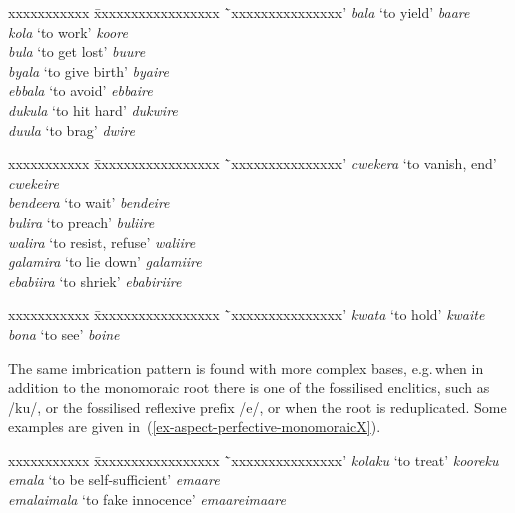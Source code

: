 \ea \label{ex-aspect-perfective-lateral}
\begin{tabbing}
xxxxxxxxxxx \= xxxxxxxxxxxxxxxxx \=`xxxxxxxxxxxxxxx'\kill
\textit{bala} \>`to yield'\> \textit{baare}\\
\textit{kola} \>`to work'\>  \textit{koore}\\
\textit{bula} \>`to get lost'\> \textit{buure}\\
\textit{byala}	\>`to give birth'\>		\textit{byaire}\\
\textit{ebbala}	\>`to avoid'\>			\textit{ebbaire}\\
\textit{dukula}	\>`to hit hard'\>		\textit{dukwire}\\
\textit{duula}	\>`to brag'\>			\textit{dwire}
\end{tabbing}
\z
\ea \label{ex-aspect-perfective-rhotic}
\begin{tabbing}
xxxxxxxxxxx \= xxxxxxxxxxxxxxxxx \=`xxxxxxxxxxxxxxx'\kill
\textit{cwekera}	\>`to vanish, end'\> 	\textit{cwekeire}\\
\textit{bendeera}	\>`to wait'\>			\textit{bendeire}\\
\textit{bulira}	\>`to preach'\>		\textit{buliire}\\
\textit{walira}	\>`to resist, refuse'\>	\textit{waliire}\\
\textit{galamira}	\>`to lie down'\>		\textit{galamiire}\\
\textit{ebabiira}	\>`to shriek'\>		\textit{ebabiriire}
\end{tabbing}
\z

\ea \label{ex-aspect-perfective-exceptions}
\begin{tabbing}
xxxxxxxxxxx \= xxxxxxxxxxxxxxxxx \=`xxxxxxxxxxxxxxx'\kill
\textit{kwata}	\>`to hold'\>	\textit{kwaite}\\
\textit{bona}	\> `to see'\> \textit{boine}
\end{tabbing}
\z

The same imbrication pattern is found with more complex bases, e.g.\,when in addition to the monomoraic root there is one of the fossilised enclitics, such as /ku/, or the fossilised reflexive prefix /e/, or when the root is  reduplicated. 
Some examples are given in~(\ref{ex-aspect-perfective-monomoraicX}).

\ea \label{ex-aspect-perfective-monomoraicX}
\begin{tabbing}
xxxxxxxxxxx \= xxxxxxxxxxxxxxxxx \=`xxxxxxxxxxxxxxx'\kill
\textit{kolaku} \>`to treat'\> \textit{kooreku}\label{ex-aspect-perfective-monomoraic-clitic}\\
\textit{emala} \>`to be self-sufficient'\> \textit{emaare}\label{ex-aspect-perfective-monomoraic-refl}\\
\textit{emalaimala} \>`to fake innocence'\> \textit{emaareimaare}\label{ex-aspect-perfective-monomoraic-redupl}
\end{tabbing}
\z

